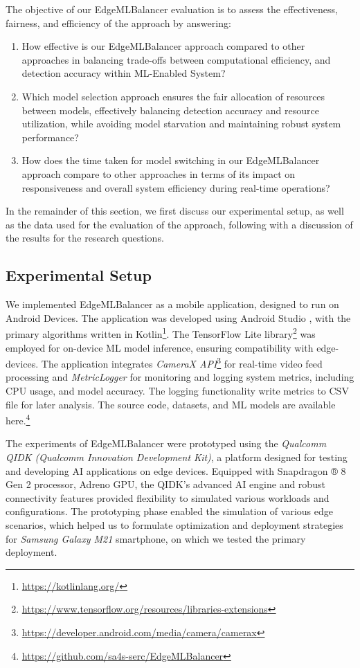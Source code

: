 The objective of our EdgeMLBalancer evaluation is to assess the effectiveness, fairness, and efficiency of the approach by answering:

\begin{enumerate}[label=\textbf{RQ\arabic*.}]
    \item How effective is our EdgeMLBalancer approach compared to other approaches in balancing trade-offs between computational efficiency, and detection accuracy within ML-Enabled System?
    \item Which model selection approach ensures the fair allocation of resources between models, effectively balancing detection accuracy and resource utilization, while avoiding model starvation and maintaining robust system performance?
    \item How does the time taken for model switching in our EdgeMLBalancer approach compare to other approaches in terms of its impact on responsiveness and overall system efficiency during real-time operations?
\end{enumerate}


In the remainder of this section, we first discuss our experimental setup, as well as the data used for the evaluation of the approach, following with a discussion of the results for the research questions. 

\subsection{Experimental Setup}

We implemented EdgeMLBalancer as a mobile application, designed to run on Android Devices. The application was developed using Android Studio \cite{b24}, with the primary algorithms written in Kotlin\footnote{\url{https://kotlinlang.org/}}. The TensorFlow Lite library\footnote{\url{https://www.tensorflow.org/resources/libraries-extensions}} was employed for on-device ML model inference, ensuring compatibility with edge-devices. The application integrates \textit{CameraX API}\footnote{\url{https://developer.android.com/media/camera/camerax}} for real-time video feed processing and \textit{MetricLogger} for monitoring and logging system metrics, including CPU usage, and model accuracy. The logging functionality write metrics to CSV file for later analysis. The source code, datasets, and ML models are available here.\footnote{\url{https://github.com/sa4s-serc/EdgeMLBalancer}}

The experiments of EdgeMLBalancer were prototyped using the \textit{Qualcomm QIDK (Qualcomm Innovation Development Kit)}, a platform designed for testing and developing AI applications on edge devices. Equipped with Snapdragon ® 8 Gen 2 processor, Adreno GPU, the QIDK's advanced AI engine and robust connectivity features provided flexibility to simulated various workloads and configurations. The prototyping phase enabled the simulation of various edge scenarios, which helped us to formulate optimization and deployment strategies for \textit{Samsung Galaxy M21} smartphone, on which we tested the primary deployment. 

